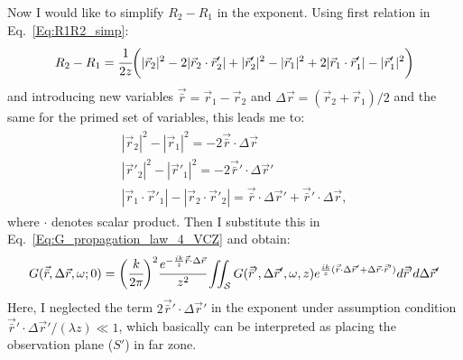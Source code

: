    Now I would like to simplify $R_2 - R_1$ in the exponent. Using first relation in Eq.~\ref{Eq:R1R2_simp}:
    \begin{align}
        R_2 - R_1 = \cfrac{1}{2z} \bigg(|\vec{r}_{2}|^2 - 2|\vec{r}_{2} \cdot \vec{r}'_{2}| + |\vec{r}'_{2}|^2 - |\vec{r}_{1}|^2 + 2|\vec{r}_{1} \cdot \vec{r}'_{1}| - |\vec{r}'_{1}|^2\bigg)
    \end{align} 
    and introducing new variables $\vec{\bar{r}} = \vec{r}_1 - \vec{r}_2$ and $\Delta\vec{r} = (\vec{r}_2 + \vec{r}_1)/2$ and the same for the primed set of variables, this leads me to: 
    \begin{align}
        \begin{array}{c}
        |\vec{r}_{2}|^2 - |\vec{r}_{1}|^2 = -2\vec{\bar{r}}\cdot\Delta\vec{r} \\
        |\vec{r}'_{2}|^2 - |\vec{r}'_{1}|^2 = -2\vec{\bar{r}}'\cdot\Delta\vec{r}' \\
        |\vec{r}_{1} \cdot \vec{r}'_{1}| - |\vec{r}_{2} \cdot \vec{r}'_{2}| = \vec{\bar{r}}\cdot\Delta\vec{r}' + \vec{\bar{r}}'\cdot\Delta\vec{r},
        \end{array}
    \end{align}
    where $\cdot$ denotes scalar product. Then I substitute this in Eq.~\ref{Eq:G_propagation_law_4_VCZ} and obtain:
    \begin{align}
        G(\vec{\bar{r}}, \Delta\vec{r}, \omega; 0) = \bigg(\cfrac{k}{ 2 \pi} \bigg)^2 \cfrac{e^{-\frac{i k}{z} \vec{\bar{r}}\cdot\Delta\vec{r}}}{z^2}     \iint_{\mathcal{S}} G(\vec{\bar{r}}', \Delta\vec{r}', \omega, z) e^{\frac{i k}{z} (\vec{\bar{r}}\cdot\Delta\vec{r}' + \Delta\vec{r}\cdot\vec{\bar{r}}')} d\vec{\bar{r}}' d\Delta\vec{r}' 
        \label{Eq:VCZ_general_form}
    \end{align}
    Here, I neglected the term $2\vec{\bar{r}}'\cdot\Delta\vec{r}'$ in the exponent under assumption condition $\vec{\bar{r}}'\cdot\Delta\vec{r}'/ (\lambda z) \ll 1$, which basically can be interpreted as placing the observation plane ($S'$) in far zone.
    
